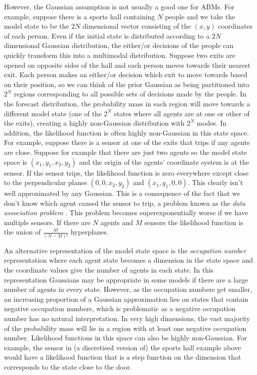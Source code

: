 \documentclass{article}
\begin{document}
However, the Gaussian assumption is not usually a good one for ABMs. For example, suppose there is a sports hall containing $N$ people and we take the model state to be the $2N$ dimensional vector consisting of the $(x,y)$ coordinates of each person. Even if the initial state is distributed according to a $2N$ dimensional Gaussian distribution, the either/or decisions of the people can quickly transform this into a multimodal distribution. Suppose two exits are opened on opposite sides of the hall and each person moves towards their nearest exit. Each person makes an either/or decision which exit to move towards based on their position, so we can think of the prior Gaussian as being partitioned into $2^N$ regions corresponding to all possible sets of decisions made by the people. In the forecast distribution, the probability mass in each region will move towards a different model state (one of the $2^N$ states where all agents are at one or other of the exits), creating a highly non-Gaussian distribution with $2^N$ modes. In addition, the likelihood function is often highly non-Gaussian in this state space. For example, suppose there is a sensor at one of the exits that trips if any agents are close. Suppose for example that there are just two agents so the model state space is $(x_1,y_1,x_2,y_2)$ and the origin of the agents' coordinate system is at the sensor. If the sensor trips, the likelihood function is zero everywhere except close to the perpendicular planes $(0,0,x_2,y_2)$ and $(x_1,y_1,0,0)$. This clearly isn't well approximated by any Gaussian. This is a consequence of the fact that we don't know which agent caused the sensor to trip, a problem known as the \textit{data association problem} \citep{lueck_who_2019}. This problem becomes superexponentially worse if we have multiple sensors. If there are $N$ agents and $M$ sensors the likelihood function is the union of $\frac{N!}{(N-M)!}$ hyperplanes.

An alternative representation of the model state space is the \textit{occupation number} representation where each agent state becomes a dimension in the state space and the coordinate values give the number of agents in each state. In this representation Gaussians may be appropriate in some models if there are a large number of agents in every state. However, as the occupation numbers get smaller, an increasing proportion of a Gaussian approximation lies on states that contain negative occupation numbers, which is problematic as a negative occupation number has no natural interpretation. In very high dimensions, the vast majority of the probability mass will lie in a region with at least one negative occupation number. Likelihood functions in this space can also be highly non-Gaussian. For example, the sensor in (a discretised version of) the sports hall example above would have a likelihood function that is a step function on the dimension that corresponds to the state close to the door.
\end{document}
